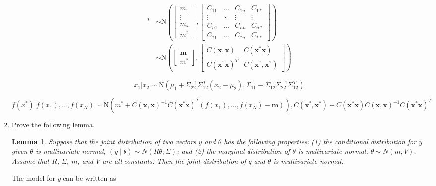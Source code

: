 \documentclass[10pt]{article}
\newtheorem{lemma}[theorem]{Lemma}
\begin{document}
\begin{enumerate}[label=(\Alph*)]
        \begin{align*}
            [f(x_1), ... , f(x_N), f(x^*)]^T &\sim \text{N} \left( \begin{bmatrix}m_1 \\ \vdots \\ m_n \\ m^*\end{bmatrix}, \begin{bmatrix}C_{11} & \dots & C_{1n} & C_{1 *}\\ \vdots & \ddots & \vdots & \vdots \\ C_{n1} & \dots & C_{nn} & C_{n*} \\ C_{*1} & \dots & C_{*n} & C_{**} \end{bmatrix}\right) \\
            & \sim \text{N} \left ( \begin{bmatrix} \mathbf{m} \\ m^*\end{bmatrix}, \begin{bmatrix} C(\mathbf{x, x}) & C(\mathbf{x^*x}) \\ C(\mathbf{x^*x})^T & C(\mathbf{x^*, x^*})\end{bmatrix}\right)
        \end{align*}

        $$x_1 | x_2 \sim \text{N}(\mu_1 + \Sigma_{22}^{-1} \Sigma_{12}^T(x_2 - \mu_2), \Sigma_{11} - \Sigma_{12} \Sigma_{22}^{-1}\Sigma_{12}^T)$$

        $$f(x^*) | f(x_1), ..., f(x_N) \sim \text{N} \left ( m^* + C(\mathbf{x, x})^{-1}C(\mathbf{x^*x})^T(f(x_1), ...,f(x_N) - \mathbf{m})\right), C(\mathbf{x^*, x^*}) - C(\mathbf{x^*x}) C(\mathbf{x, x})^{-1} C(\mathbf{x^*x})^T $$

        \item Prove the following lemma.

        \begin{lemma}
        Suppose that the joint distribution of two vectors $y$ and $\theta$ has the following properties: (1) the conditional distribution for $y$ given $\theta$ is multivariate normal, $(y \mid \theta) \sim N(R\theta, \Sigma)$; and (2) the marginal distribution of $\theta$ is multivariate normal, $\theta \sim N(m,V)$.  Assume that $R$, $\Sigma$, $m$, and $V$ are all constants.  Then the joint distribution of $y$ and $\theta$ is multivariate normal.
        \end{lemma}

        The model for $y$ can be written as


\end{enumerate}
\end{document}
